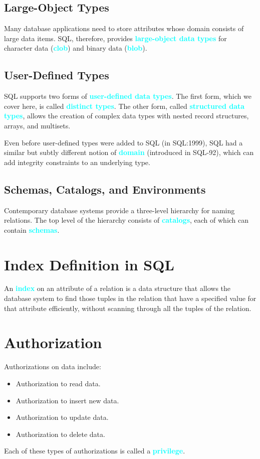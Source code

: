 \documentclass[a4paper,12pt,twoside,openany]{book}
\newcommand{\textcy}[1]{\textbf{\textcolor{cyan}{#1}}}
\begin{document}
\subsection{Large-Object Types}

Many database applications need to store attributes whose domain consists of large data items. SQL, therefore, provides \textcy{large-object data types} for character data (\textcy{clob}) and binary data (\textcy{blob}).

\subsection{User-Defined Types}

SQL supports two forms of \textcy{user-defined data types}. The first form, which we cover here, is called \textcy{distinct types}. The other form, called \textcy{structured data types}, allows the creation of complex data types with nested record structures, arrays, and multisets.

Even before user-defined types were added to SQL (in SQL:1999), SQL had a similar but subtly different notion of \textcy{domain} (introduced in SQL-92), which can add integrity constraints to an underlying type.

\subsection{Schemas, Catalogs, and Environments}

Contemporary database systems provide a three-level hierarchy for naming relations. The top level of the hierarchy consists of \textcy{catalogs}, each of which can contain \textcy{schemas}.

\section{Index Definition in SQL}

An \textcy{index} on an attribute of a relation is a data structure that allows the database system to find those tuples in the relation that have a specified value for that attribute efficiently, without scanning through all the tuples of the relation.

\section{Authorization}

Authorizations on data include:
\begin{itemize}
    \item Authorization to read data.
    \item Authorization to insert new data.
    \item Authorization to update data.
    \item Authorization to delete data.
\end{itemize}
Each of these types of authorizations is called a \textcy{privilege}.
\end{document}

